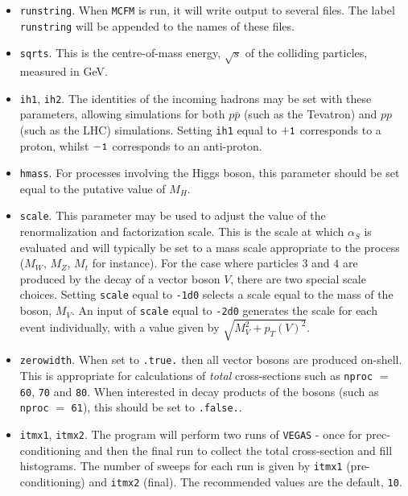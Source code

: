 \documentclass[12pt]{article}
\begin{document}
\begin{itemize}
\item {\tt runstring}.
When {\tt MCFM} is run, it will write output to several files. The
label {\tt runstring} will be appended to the names of these files.

\item {\tt sqrts}. This is the centre-of-mass energy, $\sqrt{s}$ of
the colliding particles, measured in GeV.

\item {\tt ih1}, {\tt ih2}. The identities of the incoming hadrons
may be set with these parameters, allowing simulations for both
$p{\bar p}$ (such as the Tevatron) and $pp$ (such as the LHC)
simulations. Setting {\tt ih1} equal to ${\tt +1}$ corresponds to
a proton, whilst ${\tt -1}$ corresponds to an anti-proton.

\item {\tt hmass}. For processes involving the Higgs boson, this
parameter should be set equal to the putative value of $M_H$.

\item {\tt scale}. This parameter may be used to adjust the value
of the renormalization and factorization scale. This is the scale
at which $\alpha_S$ is evaluated and will typically be set to
a mass scale appropriate to the process ($M_W$, $M_Z$, $M_t$ for
instance).
For the case where particles $3$ and $4$ are produced by the decay of
a vector boson $V$, there are two special scale choices. Setting
{\tt scale} equal to {\tt -1d0} selects a scale equal to the mass of
the boson, $M_V$. An input of {\tt scale} equal to {\tt -2d0}
generates the scale for each event individually, with a value
given by $\sqrt{M_V^2+p_T(V)^2}$.

\item {\tt zerowidth}. When set to {\tt .true.} then all vector
bosons are produced on-shell. This is appropriate for calculations
of {\it total} cross-sections such as {\tt nproc} $=$ {\tt 60},
{\tt 70} and {\tt 80}. When interested in decay products of the
bosons (such as {\tt nproc} $=$ {\tt 61}), this should be set
to {\tt .false.}.

\item {\tt itmx1}, {\tt itmx2}. The program will perform two runs of
{\tt VEGAS} - once for prec-conditioning and then the final run to
collect the total cross-section and fill histograms. The number of
sweeps for each run is given by {\tt itmx1} (pre-conditioning)
and {\tt itmx2} (final). The recommended values are the default,
{\tt 10}.


\end{itemize}
\end{document}
